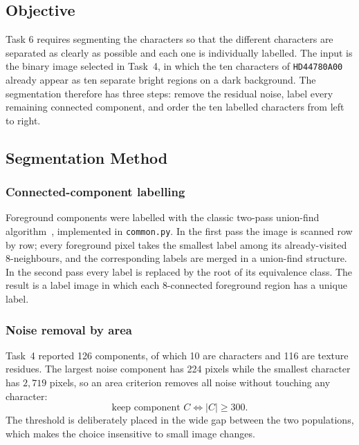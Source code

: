 \subsection{Objective}

Task 6 requires segmenting the characters so that the different characters
are separated as clearly as possible and each one is individually labelled.
The input is the binary image selected in Task~4, in which the ten characters
of \texttt{HD44780A00} already appear as ten separate bright regions on a dark
background.  The segmentation therefore has three steps: remove the residual
noise, label every remaining connected component, and order the ten labelled
characters from left to right.

\subsection{Segmentation Method}

\subsubsection{Connected-component labelling}

Foreground components were labelled with the classic two-pass
union-find algorithm~\cite{gonzalez2018}, implemented in \texttt{common.py}.  In the first pass the
image is scanned row by row; every foreground pixel takes the smallest label
among its already-visited 8-neighbours, and the corresponding labels are
merged in a union-find structure.  In the second pass every label is replaced
by the root of its equivalence class.  The result is a label image in which
each 8-connected foreground region has a unique label.

\subsubsection{Noise removal by area}

Task~4 reported 126 components, of which 10 are characters and 116 are texture
residues.  The largest noise component has 224 pixels while the smallest
character has $2{,}719$ pixels, so an area criterion removes all noise without
touching any character:
\begin{equation}
  \text{keep component } C \iff \lvert C\rvert \geq 300 .
  \label{eq:task6-area}
\end{equation}
The threshold is deliberately placed in the wide gap between the two
populations, which makes the choice insensitive to small image changes.

